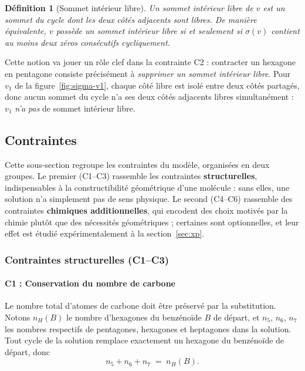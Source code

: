\documentclass[11pt,a4paper]{article}
\newtheorem{definition}{Définition}
\begin{document}
\begin{definition}[Sommet intérieur libre]
Un \emph{sommet intérieur libre} de $v$ est un sommet du cycle dont les
\emph{deux} côtés adjacents sont libres. De manière équivalente, $v$
possède un sommet intérieur libre si et seulement si $\sigma(v)$
contient au moins deux zéros consécutifs cycliquement.
\end{definition}

Cette notion va jouer un rôle clef dans la contrainte C2 :
contracter un hexagone en pentagone consiste précisément à
\emph{supprimer un sommet intérieur libre}. Pour
$v_1$ de la figure~\ref{fig:sigma-v1}, chaque côté libre est isolé
entre deux côtés partagés, donc aucun sommet du cycle n'a ses deux
côtés adjacents libres simultanément : $v_1$ \emph{n'a pas} de sommet
intérieur libre.

\subsection{Contraintes}
\label{sec:contraintes}

Cette sous-section regroupe les contraintes du modèle, organisées en
deux groupes. Le premier (C1--C3) rassemble les contraintes
\textbf{structurelles}, indispensables à la constructibilité
géométrique d'une molécule : sans elles, une solution n'a simplement
pas de sens physique. Le second (C4--C6) rassemble des contraintes
\textbf{chimiques additionnelles}, qui encodent des choix motivés par
la chimie plutôt que des nécessités géométriques ; certaines sont
optionnelles, et leur effet est étudié expérimentalement à la
section~\ref{sec:xp}. 

\subsubsection{Contraintes structurelles (C1--C3)}

\paragraph*{C1 : Conservation du nombre de carbone}
\label{sec:c1}

Le nombre total d'atomes de carbone doit être préservé par la
substitution. Notons $n_H(B)$ le nombre d'hexagones du benzénoïde $B$
de départ, et $n_5$, $n_6$, $n_7$ les nombres respectifs de
pentagones, hexagones et heptagones dans la solution. Tout cycle de la
solution remplace exactement un hexagone du benzénoïde de départ, donc
\[
  n_5 + n_6 + n_7 \;=\; n_H(B) .
\]
\end{document}
